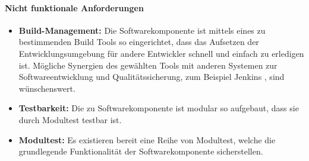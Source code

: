 \documentclass[a4paper]{article}
\begin{document}
	\paragraph{Nicht funktionale Anforderungen}
	\begin{itemize}
		\item \textbf{Build-Management:} Die Softwarekomponente ist mittels
		eines zu bestimmenden Build Tools so eingerichtet, dass das Aufsetzen 
		der	Entwicklungsumgebung für andere Entwickler schnell und einfach
		zu erledigen ist. Mögliche Synergien des gewählten Tools mit anderen
		Systemen zur Softwareentwicklung und Qualitätssicherung, zum Beispiel  
		Jenkins \cite{Jenkins}, sind wünschenswert.
		\item \textbf{Testbarkeit:} Die zu Softwarekomponente
		ist modular so aufgebaut, dass sie durch Modultest testbar ist.
		\item \textbf{Modultest:} Es existieren bereit eine Reihe von
		Modultest, welche die grundlegende Funktionalität der 
		Softwarekomponente sicherstellen.
	\end{itemize} 
	
	\newpage
	\printbibliography[type=online,heading=subbibliography,title={Webseiten}]
	\newpage
	\listoffigures
	\newpage
	\listoftables
\end{document}
